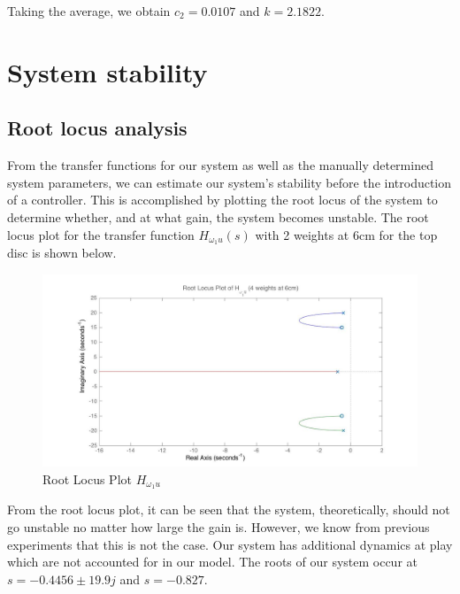 \documentclass[11pt,titlepage]{article}
\begin{document}
	Taking the average, we obtain $c_2 = 0.0107$ and $k=2.1822$.
	
	
\section{System stability}
	\subsection{Root locus analysis}
	From the transfer functions for our system as well as the manually determined system parameters, we can estimate our system's stability before the introduction of a controller. This is accomplished by plotting the root locus of the system to determine whether, and at what gain, the system becomes unstable. The root locus plot for the transfer function $H_{\omega_{1}u}(s)$ with 2 weights at 6cm for the top disc is shown below. 
	\begin{figure}[H]
            \centering
            \includegraphics[trim={6cm 0 1cm 1cm},clip,origin=c,scale=0.26]{rlplot_4w_6cm_2disks}
            \caption{Root Locus Plot $H_{\omega_{1}u}$}
            \label{fig:disc_sys}
       \end{figure}
       
       From the root locus plot, it can be seen that the system, theoretically, should not go unstable no matter how large the gain is. However, we know from previous experiments that this is not the case. Our system has additional dynamics at play which are not accounted for in our model. The roots of our system occur at $s=-0.4456 \pm 19.9j$ and $s=-0.827$. 
       
\end{document}
